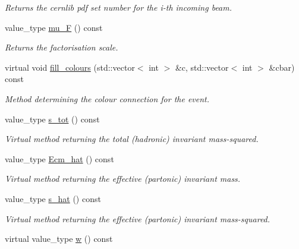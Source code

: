 \begin{DoxyCompactItemize}
\begin{DoxyCompactList}\small\item\em Returns the cernlib pdf set number for the i-\/th incoming beam. \end{DoxyCompactList}\item 
\hypertarget{a00444_ab6d6385b83be901d28b7bdc5a5bed8bd}{value\-\_\-type \hyperlink{a00444_ab6d6385b83be901d28b7bdc5a5bed8bd}{mu\-\_\-\-F} () const }\label{a00444_ab6d6385b83be901d28b7bdc5a5bed8bd}

\begin{DoxyCompactList}\small\item\em Returns the factorisation scale. \end{DoxyCompactList}\item 
\hypertarget{a00444_abebffbb041d82b15b6f73ba807d0d894}{virtual void \hyperlink{a00444_abebffbb041d82b15b6f73ba807d0d894}{fill\-\_\-colours} (std\-::vector$<$ int $>$ \&c, std\-::vector$<$ int $>$ \&cbar) const }\label{a00444_abebffbb041d82b15b6f73ba807d0d894}

\begin{DoxyCompactList}\small\item\em Method determining the colour connection for the event. \end{DoxyCompactList}\item 
\hypertarget{a00444_ac3dcfe284b1069885658f83e77cadec5}{value\-\_\-type \hyperlink{a00444_ac3dcfe284b1069885658f83e77cadec5}{s\-\_\-tot} () const }\label{a00444_ac3dcfe284b1069885658f83e77cadec5}

\begin{DoxyCompactList}\small\item\em Virtual method returning the total (hadronic) invariant mass-\/squared. \end{DoxyCompactList}\item 
value\-\_\-type \hyperlink{a00444_a307ae50a6bf7e383633d37a2f4e111b2}{Ecm\-\_\-hat} () const 
\begin{DoxyCompactList}\small\item\em Virtual method returning the effective (partonic) invariant mass. \end{DoxyCompactList}\item 
\hypertarget{a00444_ae489fffc97e9f0d006b1e6459908707b}{value\-\_\-type \hyperlink{a00444_ae489fffc97e9f0d006b1e6459908707b}{s\-\_\-hat} () const }\label{a00444_ae489fffc97e9f0d006b1e6459908707b}

\begin{DoxyCompactList}\small\item\em Virtual method returning the effective (partonic) invariant mass-\/squared. \end{DoxyCompactList}\item 
\hypertarget{a00444_adc73c84a8f49e4a1e9c01021d7c88e2a}{virtual value\-\_\-type \hyperlink{a00444_adc73c84a8f49e4a1e9c01021d7c88e2a}{w} () const }\label{a00444_adc73c84a8f49e4a1e9c01021d7c88e2a}


\end{DoxyCompactItemize}
